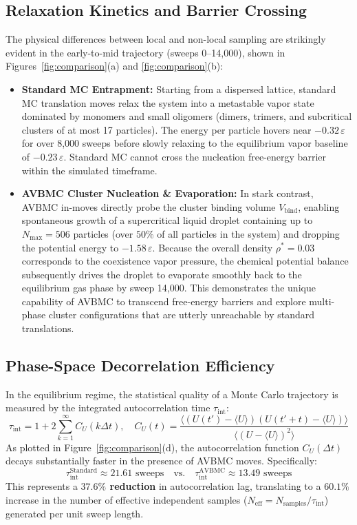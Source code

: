 \documentclass[11pt,a4paper]{article}
\begin{document}
\subsection{Relaxation Kinetics and Barrier Crossing}
The physical differences between local and non-local sampling are strikingly evident in the early-to-mid trajectory (sweeps 0--14,000), shown in Figures~\ref{fig:comparison}(a) and \ref{fig:comparison}(b):
\begin{itemize}
    \item \textbf{Standard MC Entrapment:} Starting from a dispersed lattice, standard MC translation moves relax the system into a metastable vapor state dominated by monomers and small oligomers (dimers, trimers, and subcritical clusters of at most 17 particles). The energy per particle hovers near $-0.32\,\varepsilon$ for over 8,000 sweeps before slowly relaxing to the equilibrium vapor baseline of $-0.23\,\varepsilon$. Standard MC cannot cross the nucleation free-energy barrier within the simulated timeframe.
    \item \textbf{AVBMC Cluster Nucleation \& Evaporation:} In stark contrast, AVBMC in-moves directly probe the cluster binding volume $V_{\mathrm{bind}}$, enabling spontaneous growth of a supercritical liquid droplet containing up to $N_{\mathrm{max}} = 506$ particles (over $50\%$ of all particles in the system) and dropping the potential energy to $-1.58\,\varepsilon$. Because the overall density $\rho^* = 0.03$ corresponds to the coexistence vapor pressure, the chemical potential balance subsequently drives the droplet to evaporate smoothly back to the equilibrium gas phase by sweep 14,000. This demonstrates the unique capability of AVBMC to transcend free-energy barriers and explore multi-phase cluster configurations that are utterly unreachable by standard translations.
\end{itemize}

\subsection{Phase-Space Decorrelation Efficiency}
In the equilibrium regime, the statistical quality of a Monte Carlo trajectory is measured by the integrated autocorrelation time $\tau_{\mathrm{int}}$:
\begin{equation}
\tau_{\mathrm{int}} = 1 + 2 \sum_{k=1}^{\infty} C_U(k \Delta t), \quad C_U(t) = \frac{\langle (U(t') - \langle U \rangle)(U(t'+t) - \langle U \rangle) \rangle}{\langle (U - \langle U \rangle)^2 \rangle}
\end{equation}
As plotted in Figure~\ref{fig:comparison}(d), the autocorrelation function $C_U(\Delta t)$ decays substantially faster in the presence of AVBMC moves. Specifically:
\begin{equation}
\tau_{\mathrm{int}}^{\mathrm{Standard}} \approx 21.61\text{ sweeps} \quad \text{vs.} \quad \tau_{\mathrm{int}}^{\mathrm{AVBMC}} \approx 13.49\text{ sweeps}
\end{equation}
This represents a \textbf{$\mathbf{37.6\%}$ reduction} in autocorrelation lag, translating to a $\mathbf{60.1\%}$ increase in the number of effective independent samples ($N_{\mathrm{eff}} = N_{\mathrm{samples}} / \tau_{\mathrm{int}}$) generated per unit sweep length.
\end{document}
